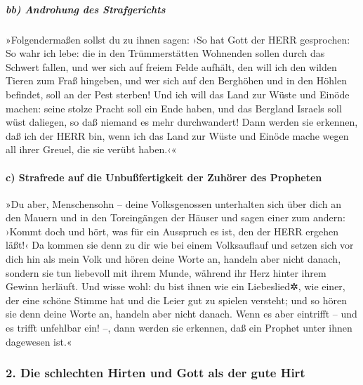 \hypertarget{bb-androhung-des-strafgerichts}{%
\subparagraph{bb) Androhung des
Strafgerichts}\label{bb-androhung-des-strafgerichts}}

»Folgendermaßen sollst du zu ihnen sagen: ›So hat Gott
der HERR gesprochen: So wahr ich lebe: die in den Trümmerstätten
Wohnenden sollen durch das Schwert fallen, und wer sich auf freiem Felde
aufhält, den will ich den wilden Tieren zum Fraß hingeben, und wer sich
auf den Berghöhen und in den Höhlen befindet, soll an der Pest sterben!
Und ich will das Land zur Wüste und Einöde machen: seine
stolze Pracht soll ein Ende haben, und das Bergland Israels soll wüst
daliegen, so daß niemand es mehr durchwandert! Dann
werden sie erkennen, daß ich der HERR bin, wenn ich das Land zur Wüste
und Einöde mache wegen all ihrer Greuel, die sie verübt haben.‹«

\hypertarget{c-strafrede-auf-die-unbuuxdffertigkeit-der-zuhuxf6rer-des-propheten}{%
\paragraph{c) Strafrede auf die Unbußfertigkeit der Zuhörer des
Propheten}\label{c-strafrede-auf-die-unbuuxdffertigkeit-der-zuhuxf6rer-des-propheten}}

»Du aber, Menschensohn -- deine Volksgenossen unterhalten
sich über dich an den Mauern und in den Toreingängen der Häuser und
sagen einer zum andern: ›Kommt doch und hört, was für ein Ausspruch es
ist, den der HERR ergehen läßt!‹ Da kommen sie denn zu
dir wie bei einem Volksauflauf und setzen sich vor dich hin als mein
Volk und hören deine Worte an, handeln aber nicht danach, sondern sie
tun liebevoll mit ihrem Munde, während ihr Herz hinter ihrem Gewinn
herläuft. Und wisse wohl: du bist ihnen wie ein
Liebeslied✲, wie einer, der eine schöne Stimme hat und die Leier gut zu
spielen versteht; und so hören sie denn deine Worte an, handeln aber
nicht danach. Wenn es aber eintrifft -- und es trifft
unfehlbar ein! --, dann werden sie erkennen, daß ein Prophet unter ihnen
dagewesen ist.«

\hypertarget{die-schlechten-hirten-und-gott-als-der-gute-hirt}{%
\subsubsection{2. Die schlechten Hirten und Gott als der gute
Hirt}\label{die-schlechten-hirten-und-gott-als-der-gute-hirt}}

